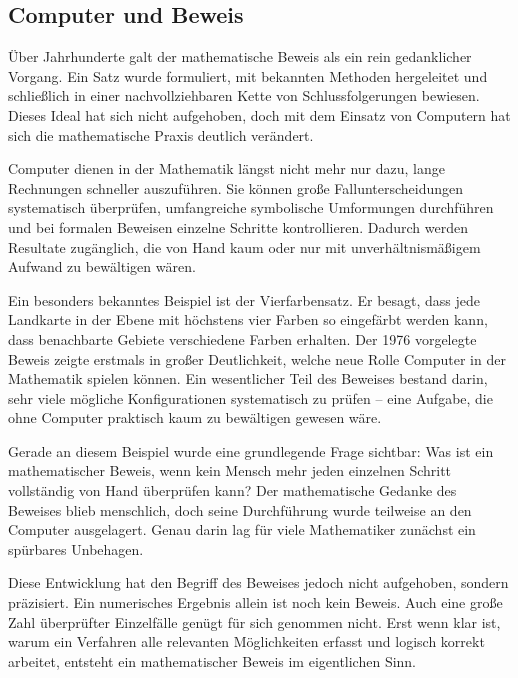 
\subsection{Computer und Beweis}

Über Jahrhunderte galt der mathematische Beweis als ein rein gedanklicher Vorgang. Ein Satz wurde formuliert, mit bekannten Methoden hergeleitet und schließlich in einer nachvollziehbaren Kette von Schlussfolgerungen bewiesen. Dieses Ideal hat sich nicht aufgehoben, doch mit dem Einsatz von Computern hat sich die mathematische Praxis deutlich verändert.

Computer dienen in der Mathematik längst nicht mehr nur dazu, lange Rechnungen schneller auszuführen. Sie können große Fallunterscheidungen systematisch überprüfen, umfangreiche symbolische Umformungen durchführen und bei formalen Beweisen einzelne Schritte kontrollieren. Dadurch werden Resultate zugänglich, die von Hand kaum oder nur mit unverhältnismäßigem Aufwand zu bewältigen wären.

Ein besonders bekanntes Beispiel ist der Vierfarbensatz. Er besagt, dass jede Landkarte in der Ebene mit höchstens vier Farben so eingefärbt werden kann, dass benachbarte Gebiete verschiedene Farben erhalten. Der 1976 vorgelegte Beweis zeigte erstmals in großer Deutlichkeit, welche neue Rolle Computer in der Mathematik spielen können. Ein wesentlicher Teil des Beweises bestand darin, sehr viele mögliche Konfigurationen systematisch zu prüfen -- eine Aufgabe, die ohne Computer praktisch kaum zu bewältigen gewesen wäre.

Gerade an diesem Beispiel wurde eine grundlegende Frage sichtbar: Was ist ein mathematischer Beweis, wenn kein Mensch mehr jeden einzelnen Schritt vollständig von Hand überprüfen kann? Der mathematische Gedanke des Beweises blieb menschlich, doch seine Durchführung wurde teilweise an den Computer ausgelagert. Genau darin lag für viele Mathematiker zunächst ein spürbares Unbehagen.

Diese Entwicklung hat den Begriff des Beweises jedoch nicht aufgehoben, sondern präzisiert. Ein numerisches Ergebnis allein ist noch kein Beweis. Auch eine große Zahl überprüfter Einzelfälle genügt für sich genommen nicht. Erst wenn klar ist, warum ein Verfahren alle relevanten Möglichkeiten erfasst und logisch korrekt arbeitet, entsteht ein mathematischer Beweis im eigentlichen Sinn.

